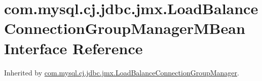 \hypertarget{interfacecom_1_1mysql_1_1cj_1_1jdbc_1_1jmx_1_1_load_balance_connection_group_manager_m_bean}{}\section{com.\+mysql.\+cj.\+jdbc.\+jmx.\+Load\+Balance\+Connection\+Group\+Manager\+M\+Bean Interface Reference}
\label{interfacecom_1_1mysql_1_1cj_1_1jdbc_1_1jmx_1_1_load_balance_connection_group_manager_m_bean}


Inherited by \mbox{\hyperlink{classcom_1_1mysql_1_1cj_1_1jdbc_1_1jmx_1_1_load_balance_connection_group_manager}{com.\+mysql.\+cj.\+jdbc.\+jmx.\+Load\+Balance\+Connection\+Group\+Manager}}.

